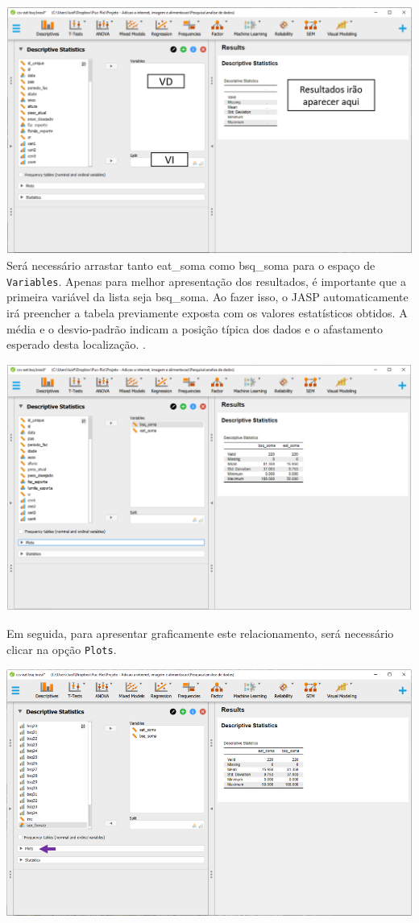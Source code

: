 \documentclass[
]{book}
\begin{document}
\includegraphics{./img/cap_correlacao_descritivo2.png}
Será necessário arrastar tanto eat\_soma como bsq\_soma para o espaço de \texttt{Variables}. Apenas para melhor apresentação dos resultados, é importante que a primeira variável da lista seja bsq\_soma. Ao fazer isso, o JASP automaticamente irá preencher a tabela previamente exposta com os valores estatísticos obtidos. A média e o desvio-padrão indicam a posição típica dos dados e o afastamento esperado desta localização. .

\includegraphics{./img/cap_correlacao_descritivo3.png}

Em seguida, para apresentar graficamente este relacionamento, será necessário clicar na opção \texttt{Plots}.

\includegraphics{./img/cap_correlacao_plot.png}
\end{document}
